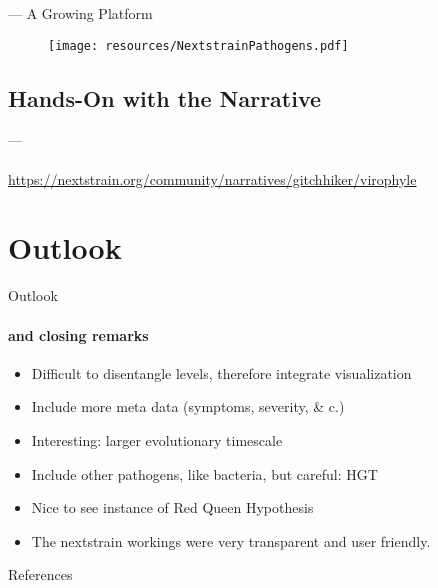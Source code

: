 \documentclass{beamer}
\begin{document}
\begin{darkframes}
    \begin{frame}{\secname --- A Growing Platform}
      \begin{figure}
        \texttt{[image: resources/NextstrainPathogens.pdf]}
        \vspace*{-.2cm}
        \caption{\footnotesize }
      \end{figure}
    \end{frame}

    \subsection{Hands-On with the Narrative}

    \begin{frame}{\secname --- \subsecname}
      \framesubtitle{}
      \href{URL}{https://nextstrain.org/community/narratives/gitchhiker/virophyle}
    \end{frame}

    \section{Outlook}

    \begin{frame}{Outlook}
      \framesubtitle{and closing remarks}
      \begin{itemize}
        \item Difficult to disentangle levels, therefore integrate visualization
        \item Include more meta data (symptoms, severity, \& c.)
        \item Interesting: larger evolutionary timescale
        \item Include other pathogens, like bacteria, but careful: HGT
        \item Nice to see instance of Red Queen Hypothesis
        \item The nextstrain workings were very transparent and user friendly.
      \end{itemize}
    \end{frame}

    \begin{frame}[allowframebreaks]{References}
    \tiny


    \end{frame}




  \end{darkframes}
\end{document}

